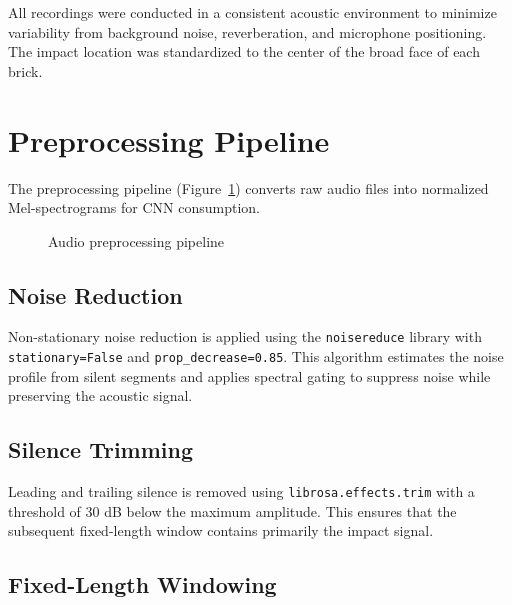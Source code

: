 \documentclass[12pt,a4paper,oneside]{report}
\begin{document}
All recordings were conducted in a consistent acoustic environment to minimize variability from background noise, reverberation, and microphone positioning. The impact location was standardized to the center of the broad face of each brick.

\section{Preprocessing Pipeline}

The preprocessing pipeline (Figure~\ref{fig:pipeline}) converts raw audio files into normalized Mel-spectrograms for CNN consumption.

\begin{figure}[H]
\centering
{}
\caption{Audio preprocessing pipeline}
\label{fig:pipeline}
\end{figure}

\subsection{Noise Reduction}

Non-stationary noise reduction is applied using the \texttt{noisereduce} library with \texttt{stationary=False} and \texttt{prop\_decrease=0.85}. This algorithm estimates the noise profile from silent segments and applies spectral gating to suppress noise while preserving the acoustic signal.

\subsection{Silence Trimming}

Leading and trailing silence is removed using \texttt{librosa.effects.trim} with a threshold of 30 dB below the maximum amplitude. This ensures that the subsequent fixed-length window contains primarily the impact signal.

\subsection{Fixed-Length Windowing}
\end{document}
